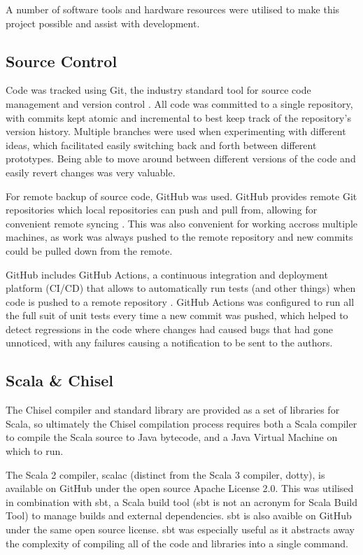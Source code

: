 A number of software tools and hardware resources were utilised to make this project possible and assist with development.

\subsection{Source Control}

Code was tracked using Git, the industry standard tool for source code management and version control \cite{git}. All code was committed to a single repository, with commits kept atomic and incremental to best keep track of the repository's version history. Multiple branches were used when experimenting with different ideas, which facilitated easily switching back and forth between different prototypes. Being able to move around between different versions of the code and easily revert changes was very valuable.

For remote backup of source code, GitHub was used. GitHub provides remote Git repositories which local repositories can push and pull from, allowing for convenient remote syncing \cite{github}. This was also convenient for working accross multiple machines, as work was always pushed to the remote repository and new commits could be pulled down from the remote.

GitHub includes GitHub Actions, a continuous integration and deployment platform (CI/CD) that allows to automatically run tests (and other things) when code is pushed to a remote repository  \cite{gha}. GitHub Actions was configured to run all the full suit of unit tests every time a new commit was pushed, which helped to detect regressions in the code where changes had caused bugs that had gone unnoticed, with any failures causing a notification to be sent to the authors.

\subsection{Scala \& Chisel}

The Chisel compiler and standard library are provided as a set of libraries for Scala, so ultimately the Chisel compilation process requires both a Scala compiler to compile the Scala source to Java bytecode, and a Java Virtual Machine on which to run.

The Scala 2 compiler, scalac (distinct from the Scala 3 compiler, dotty), is available on GitHub under the open source Apache License 2.0. This was utilised in combination with sbt, a Scala build tool (sbt is not an acronym for Scala Build Tool) to manage builds and external dependencies. sbt is also avaible on GitHub under the same open source license. sbt was especially useful as it abstracts away the complexity of compiling all of the code and libraries into a single  command.

